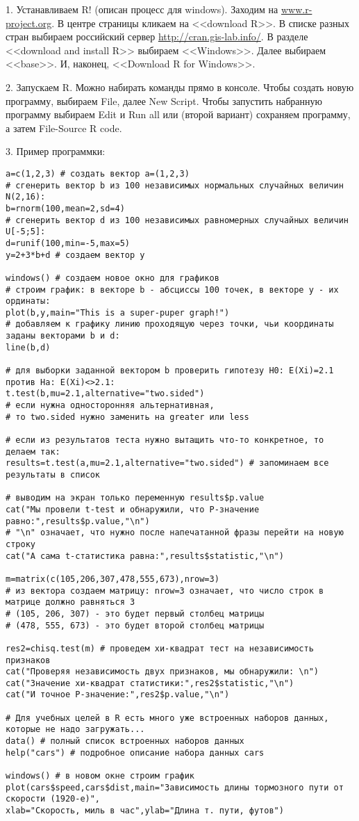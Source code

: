 \documentclass[pdftex,12pt,a4paper]{article}
\begin{document}
1. Устанавливаем R! (описан процесс для windows). Заходим на \url{www.r-project.org}. В центре страницы кликаем на <<download R>>. В списке разных стран выбираем российский сервер \url{http://cran.gis-lab.info/}. В разделе <<download and install R>> выбираем <<Windows>>. Далее выбираем <<base>>. И, наконец, <<Download R for Windows>>.

2. Запускаем R. Можно набирать команды прямо в консоле. Чтобы создать новую программу, выбираем File, далее New Script. Чтобы запустить набранную программу выбираем Edit и Run all или (второй вариант) сохраняем программу, а затем File-Source R code.

3. Пример программки:
\begin{verbatim}
a=c(1,2,3) # создать вектор a=(1,2,3) 
# сгенерить вектор b из 100 независимых нормальных случайных величин N(2,16):
b=rnorm(100,mean=2,sd=4) 
# сгенерить вектор d из 100 независимых равномерных случайных величин U[-5;5]:
d=runif(100,min=-5,max=5) 
y=2+3*b+d # создаем вектор y

windows() # создаем новое окно для графиков
# строим график: в векторе b - абсциссы 100 точек, в векторе y - их ординаты:
plot(b,y,main="This is a super-puper graph!") 
# добавляем к графику линию проходящую через точки, чьи координаты заданы векторами b и d:
line(b,d) 

# для выборки заданной вектором b проверить гипотезу H0: E(Xi)=2.1 против Ha: E(Xi)<>2.1:
t.test(b,mu=2.1,alternative="two.sided") 
# если нужна односторонняя альтернативная, 
# то two.sided нужно заменить на greater или less

# если из результатов теста нужно вытащить что-то конкретное, то делаем так:
results=t.test(a,mu=2.1,alternative="two.sided") # запоминаем все результаты в список

# выводим на экран только переменную results$p.value
cat("Мы провели t-test и обнаружили, что Р-значение равно:",results$p.value,"\n")
# "\n" означает, что нужно после напечатанной фразы перейти на новую строку
cat("А сама t-статистика равна:",results$statistic,"\n")

m=matrix(c(105,206,307,478,555,673),nrow=3) 
# из вектора создаем матрицу: nrow=3 означает, что число строк в матрице должно равняться 3
# (105, 206, 307) - это будет первый столбец матрицы
# (478, 555, 673) - это будет второй столбец матрицы

res2=chisq.test(m) # проведем хи-квадрат тест на независимость признаков
cat("Проверяя независимость двух признаков, мы обнаружили: \n")
cat("Значение хи-квадрат статистики:",res2$statistic,"\n")
cat("И точное Р-значение:",res2$p.value,"\n")

# Для учебных целей в R есть много уже встроенных наборов данных, которые не надо загружать...
data() # полный список встроенных наборов данных
help("cars") # подробное описание набора данных cars

windows() # в новом окне строим график
plot(cars$speed,cars$dist,main="Зависимость длины тормозного пути от скорости (1920-е)",
xlab="Скорость, миль в час",ylab="Длина т. пути, футов")\end{verbatim}
\end{document}
